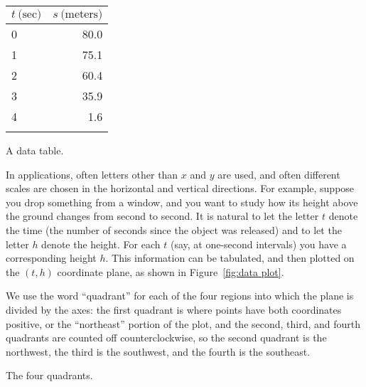 \begin{margintable}
  \centering
  \begin{tabular}{lr}
    \toprule
    $t~\text{(sec)}$ & $s~\text{(meters)}$ \\
    \midrule
    0 &80.0 \\
    1 &75.1 \\
    2 &60.4 \\
    3 & 35.9 \\
    4 & 1.6 \\
    \bottomrule \\
  \end{tabular}
  \caption{A data table.}
  \label{table:data table}
\end{margintable}

In applications, often letters other than $x$ and $y$ are used, and
often different scales are chosen in the horizontal and vertical
directions.  For example, suppose you drop something from a window,
and you want to study how its height above the ground changes from
second to second.  It is natural to let the letter $t$ denote the time
(the number of seconds since the object was released) and to let the
letter $h$ denote the height.  For each $t$ (say, at one-second
intervals) you have a corresponding height $h$.  This information can
be tabulated, and then plotted on the $(t,h)$ coordinate plane, as
shown in Figure~\ref{fig:data plot}.

We use the word ``quadrant'' for each of the four
regions into which the plane is divided by the axes: the first
quadrant is where points have both coordinates positive, or the
``northeast'' portion of the plot, and the second, third, and fourth
quadrants are counted off counterclockwise, so the second quadrant is
the northwest, the third is the southwest, and the fourth is the
southeast.

\begin{marginfigure}
  \caption{The four quadrants.}
  \label{figure:quadrants}
\end{marginfigure}

